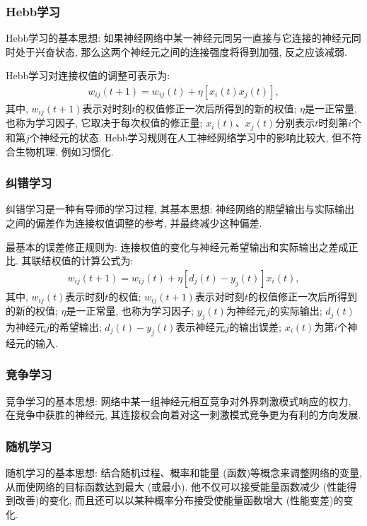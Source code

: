 \subsubsection{Hebb学习}
Hebb学习的基本思想: 如果神经网络中某一神经元同另一直接与它连接的神经元同时处于兴奋状态, 那么这两个神经元之间的连接强度将得到加强, 反之应该减弱.

Hebb学习对连接权值的调整可表示为:
\begin{align}
    w_{i j} (t+1)=w_{i j} (t)+\eta\left[x_{i}(t) x_{j}(t)\right],
\end{align}
其中, $w_{ij} (t+1)$表示对时刻$t$的权值修正一次后所得到的新的权值; $\eta$是一正常量, 也称为学习因子, 它取决于每次权值的修正量;
$x_i (t)$、$x_j (t)$分别表示$t$时刻第$i$个和第$j$个神经元的状态.
Hebb学习规则在人工神经网络学习中的影响比较大, 但不符合生物机理. 例如习惯化.
\subsubsection{纠错学习}
纠错学习是一种有导师的学习过程, 其基本思想: 神经网络的期望输出与实际输出之间的偏差作为连接权值调整的参考, 并最终减少这种偏差.

最基本的误差修正规则为: 连接权值的变化与神经元希望输出和实际输出之差成正比. 其联结权值的计算公式为:
\begin{align}
    w_{i j} (t+1)=w_{i j} (t)+\eta\left[d_{j} (t)-y_{j} (t)\right] x_{i} (t),
\end{align}
其中, $w_{ij} (t)$表示时刻$t$的权值; $w_{ij} (t+1)$表示对时刻$t$的权值修正一次后所得到的新的权值; $\eta$是一正常量, 也称为学习因子; $y_j (t)$为神经元$j$的实际输出; $d_j (t)$为神经元$j$的希望输出; $d_j (t)-y_j (t)$表示神经元$j$的输出误差; $x_i (t)$为第$i$个神经元的输入.
\subsubsection{竞争学习}
竞争学习的基本思想: 网络中某一组神经元相互竞争对外界刺激模式响应的权力, 在竞争中获胜的神经元, 其连接权会向着对这一刺激模式竞争更为有利的方向发展.
\subsubsection{随机学习}
随机学习的基本思想: 结合随机过程、概率和能量 (函数)等概念来调整网络的变量, 从而使网络的目标函数达到最大 (或最小). 他不仅可以接受能量函数减少 (性能得到改善)的变化, 而且还可以以某种概率分布接受使能量函数增大 (性能变差)的变化.
